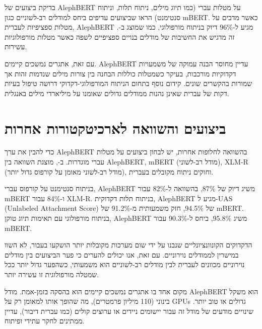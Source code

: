 בדיקת ביצועים של \textenglish{AlephBERT} על מטלות עברי (כמו תיוג מילים, ניתוח תלות, וניתוח סנטימנט) הראו שביצועים עדיפים ביחס למודלים רב-לשוניים כגון \textenglish{mBERT}. כאשר מדבים על מטלות ספציפיות לעברית, \textenglish{AlephBERT} מגיע ל-96\% דיוק בניתוח מורפולוגי, כמו שמוצג ב-\cite{alephbert2023hebrew}. זה מדגיש את החשיבות של מודלים בנויים ספציפיים לשפה כאשר מטלות מורפולוגיות עשירות.

עם זאת, אתגרים נמשכים קיימים. \textenglish{AlephBERT} עדיין מחוסר הבנה עמוקה של משמעויות דקדוקיות מורכבות, בעיקר כשמטלות כוללות הבחנה בין צורות מילים שנדמות זהות אך שמורות בהקשרים שונים. קידום נוסף בתחום הניתוח המורפולוגי-דקדוקי דרושה טיפול בעיות דקות של עברית שאינן נהנות ממודלים גדולים שאומנו על מיליארדי מילים באנגלית.

\section{ביצועים והשוואה לארכיטקטורות אחרות}

כדי להבין את ערך \textenglish{AlephBERT} בהשוואה לחלופות אחרות, יש לבחון ביצועים על מטלות עברי מוגדרות. ב-\cite{alephbert2023hebrew}, מוצגת השוואה בין \textenglish{AlephBERT}, \textenglish{mBERT} (מודל רב-לשוני), \textenglish{XLM-R} (מודל רב-לשוני מאומן על קורפוס גדול יותר), וחוקים ניתוח מקובלים בעברית.

בניתוח סנטימנט על קורפוס עברי, \textenglish{AlephBERT} משיג דיוק של 87\%, בהשוואה ל-82\% עבור \textenglish{mBERT} ו-84\% עבור \textenglish{XLM-R}. בניתוח תלות דקדוקית, \textenglish{AlephBERT} מגיע ל-\textenglish{UAS} (\textenglish{Unlabeled Attachment Score}) של 94.5\%, חזק משמעותית מ-91.2\% של \textenglish{mBERT}. בניתוח מורפולוגי עם תאימות תיוג טוקן, \textenglish{AlephBERT} משיג 95.8\%, ביחס ל-90.3\% עבור \textenglish{mBERT}.

הדקדוקים הקונוונציונליים שנבנו על ידי שום מערכות מקובלות יותר הושקעו בעבור, לא השוו במישרין לממודלים נוירוניים. עם זאת, אנו יכולים להערים כי פער הביצועים בין מודלים נוירוניים מכוונים לעברית לבין מודלים רב-לשוניים הוא משמעותי, כשהפער גדול יותר ככל שמטלה מורפולוגית זו עשירה יותר.

מקום אחד בו אתגרים נמשכים קיימים הוא בהסקה בזמן-אמת. מודל \textenglish{AlephBERT} הוא משקל בינוני (110 מיליון פרמטרים), מה שהופך אותו למאומן רק על \textenglish{GPUs} גדולים או טוב יותר. שינויים מודעים של מודל זה עבור יישומים ניידים או ערוצים קולים (כמו עברית דיבור), עדיין ממתינים לחקר עתידי ופיתוח.
